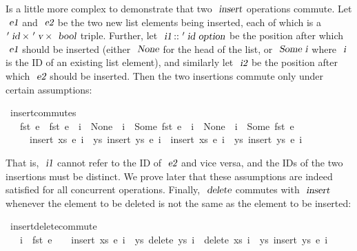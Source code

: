 Is a little more complex to demonstrate that two $\isa{insert}$ operations commute.
Let $\isa{e1}$ and $\isa{e2}$ be the two new list elements being inserted, each of which is a $\isacharprime\isa{id} \mathbin{\isasymtimes} \isacharprime\isa{v} \mathbin{\isasymtimes} \isa{bool}$ triple.
Further, let $\isa{i1} \mathbin{\isacharcolon\isacharcolon} \isacharprime\isa{id option}$ be the position after which $\isa{e1}$ should be inserted (either $\isa{None}$ for the head of the list, or $\isa{Some i}$ where $\isa{i}$ is the ID of an existing list element), and similarly let $\isa{i2}$ be the position after which $\isa{e2}$ should be inserted.
Then the two insertions commute only under certain assumptions:
\begin{isabelle}
\ insert{\isacharunderscore}commutes{\isacharcolon}\isanewline
\ \ \ {\isachardoublequoteopen}fst\ e{}\ {\isasymnoteq}\ fst\ e{}{\isachardoublequoteclose}\ \ {\isachardoublequoteopen}i{}\ {\isacharequal}\ None\ {\isasymor}\ i{}\ {\isasymnoteq}\ Some\ {\isacharparenleft}fst\ e{}{\isacharparenright}{\isachardoublequoteclose}\ \ {\isachardoublequoteopen}i{}\ {\isacharequal}\ None\ {\isasymor}\ i{}\ {\isasymnoteq}\ Some\ {\isacharparenleft}fst\ e{}{\isacharparenright}{\isachardoublequoteclose}\isanewline
\ \ \ \ \ {\isachardoublequoteopen}insert\ xs\ e{}\ i{}\ {\isasymbind}\ {\isacharparenleft}{\isasymlambda}ys{\isachardot}\ insert\ ys\ e{}\ i{}{\isacharparenright}\ {\isacharequal}\ insert\ xs\ e{}\ i{}\ {\isasymbind}\ {\isacharparenleft}{\isasymlambda}ys{\isachardot}\ insert\ ys\ e{}\ i{}{\isacharparenright}{\isachardoublequoteclose}
\end{isabelle}
\noindent
That is, $\isa{i1}$ cannot refer to the ID of $\isa{e2}$ and vice versa, and the IDs of the two insertions must be distinct.
We prove later that these assumptions are indeed satisfied for all concurrent operations.
Finally, $\isa{delete}$ commutes with $\isa{insert}$ whenever the element to be deleted is not the same as the element to be inserted:
\begin{isabelle}
\ insert{\isacharunderscore}delete{\isacharunderscore}commute{\isacharcolon}\isanewline
\ \ \ {\isachardoublequoteopen}i{}\ {\isasymnoteq}\ fst\ e{\isachardoublequoteclose}\ \ \ \ {\isachardoublequoteopen}insert\ xs\ e\ i{}\ {\isasymbind}\ {\isacharparenleft}{\isasymlambda}ys{\isachardot}\ delete\ ys\ i{}{\isacharparenright}\ {\isacharequal}\ delete\ xs\ i{}\ {\isasymbind}\ {\isacharparenleft}{\isasymlambda}ys{\isachardot}\ insert\ ys\ e\ i{}{\isacharparenright}{\isachardoublequoteclose}
\end{isabelle}

